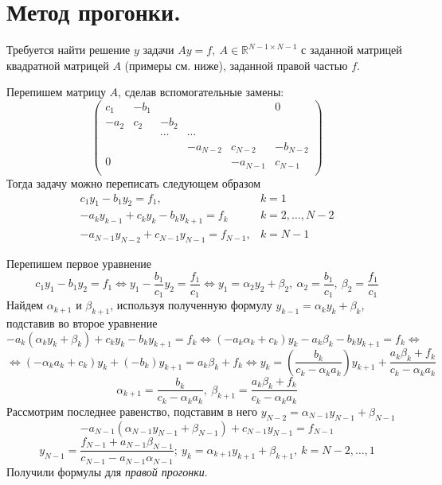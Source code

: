 \section{Метод прогонки.}

Требуется найти решение $y$ задачи $Ay=f,\ A\in \mathbb{R}^{N-1\times N-1}$
с заданной матрицей квадратной матрицей $A$ (примеры см. ниже), заданной правой частью $f$.

Перепишем матрицу $A$, сделав вспомогательные замены:
\[\left(\begin{array}{cccccc}
      c_1  & -b_1 &        &          &          & 0        \\
      -a_2 & c_2  & -b_2   &          &          &          \\
           &      & \cdots & \cdots   &          &          \\
           &      &        & -a_{N-2} & c_{N-2}  & -b_{N-2} \\
      0    &      &        &          & -a_{N-1} & c_{N-1}  \\
    \end{array}\right)\]
Тогда задачу можно переписать следующем образом
\begin{equation}\label{eq:tridiag_method}
  \begin{array}{cc}
    c_1y_1-b_1y_2=f_1,                      & k=1            \\
    -a_ky_{k-1}+c_ky_k-b_ky_{k+1}=f_k       & k=2,\ldots,N-2 \\
    -a_{N-1}y_{N-2}+c_{N-1}y_{N-1}=f_{N-1}, & k=N-1
  \end{array}
\end{equation}

Перепишем первое уравнение
\[ c_1y_1-b_1y_2=f_1 \Leftrightarrow y_1-\frac{b_1}{c_1}y_2=\frac{f_1}{c_1}\Leftrightarrow y_1=\alpha_2y_2+\beta_2,\ \alpha_2=\frac{b_1}{c_1},\ \beta_2=\frac{f_1}{c_1}\]
Найдем $\alpha_{k+1}$ и $\beta_{k+1}$, используя полученную формулу $y_{k-1}=\alpha_ky_k+\beta_k$, подставив во второе уравнение
\[-a_k(\alpha_ky_k+\beta_k)+c_ky_k-b_ky_{k+1}=f_k\Leftrightarrow(-a_k\alpha_k+c_k)y_k-a_k\beta_k-b_ky_{k+1}=f_k\Leftrightarrow\]
\[\Leftrightarrow(-\alpha_ka_k+c_k)y_k+(-b_k)y_{k+1}=a_k\beta_k+f_k\Leftrightarrow y_k=\left(\frac{b_k}{c_k-\alpha_ka_k}\right)y_{k+1}+\frac{a_k\beta_k+f_k}{c_k-\alpha_ka_k}\]
\[\alpha_{k+1}=\frac{b_k}{c_k-\alpha_ka_k},\ \beta_{k+1}=\frac{a_k\beta_k+f_k}{c_k-\alpha_ka_k}\]
Рассмотрим последнее равенство, подставим в него $y_{N-2}=\alpha_{N-1}y_{N-1}+\beta_{N-1}$
\[-a_{N-1}(\alpha_{N-1}y_{N-1}+\beta_{N-1})+c_{N-1}y_{N-1}=f_{N-1}\]
\[y_{N-1}=\frac{f_{N-1}+a_{N-1}\beta_{N-1}}{c_{N-1}-a_{N-1}\alpha_{N-1}};\ y_k=\alpha_{k+1}y_{k+1}+\beta_{k+1},\ k=N-2,\ldots,1\]
Получили формулы для \textit{правой прогонки}.

